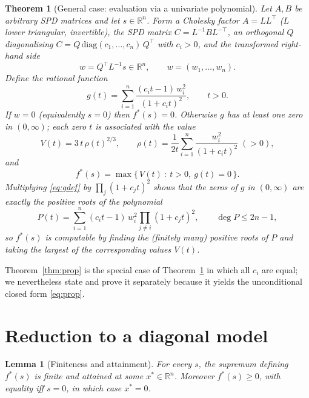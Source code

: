 \documentclass{amsart}
\newtheorem{theorem}{Theorem}
\newtheorem{lemma}{Lemma}
\theoremstyle{definition}
\begin{document}
\begin{theorem}[General case: evaluation via a univariate polynomial]\label{thm:gen}
Let $A,B$ be arbitrary SPD matrices and let $s\in\mathbb R^n$.  Form a Cholesky factor
$A=LL^{\!\top}$ ($L$ lower triangular, invertible), the SPD matrix
$C=L^{-1}BL^{-\top}$, an orthogonal $Q$ diagonalising $C=Q\,\mathrm{diag}(c_1,\dots,c_n)\,Q^{\!\top}$
with $c_i>0$, and the transformed right-hand side
\begin{equation}\label{eq:wdef}
w=Q^{\!\top}L^{-1}s\in\mathbb R^n,\qquad w=(w_1,\dots,w_n).
\end{equation}
Define the rational function
\begin{equation}\label{eq:gdef}
g(t)=\sum_{i=1}^n\frac{(c_i t-1)\,w_i^2}{(1+c_i t)^2},\qquad t>0 .
\end{equation}
If $w=0$ (equivalently $s=0$) then $f^\ast(s)=0$.  Otherwise $g$ has at least one zero in
$(0,\infty)$; each zero $t$ is associated with the value
\begin{equation}\label{eq:valt}
V(t)=3\,t\,\rho(t)^{2/3},\qquad
\rho(t)=\frac{1}{2t}\sum_{i=1}^n\frac{w_i^2}{(1+c_i t)^2}\;(>0),
\end{equation}
and
\begin{equation}\label{eq:fstar-gen}
f^\ast(s)=\max\bigl\{\,V(t)\ :\ t>0,\ g(t)=0\,\bigr\}.
\end{equation}
Multiplying \eqref{eq:gdef} by $\prod_{j}(1+c_j t)^2$ shows that the zeros of $g$ in $(0,\infty)$
are exactly the positive roots of the polynomial
\begin{equation}\label{eq:poly}
P(t)=\sum_{i=1}^n (c_i t-1)\,w_i^2\!\!\prod_{j\neq i}(1+c_j t)^2,\qquad \deg P\le 2n-1,
\end{equation}
so $f^\ast(s)$ is computable by finding the (finitely many) positive roots of $P$ and taking the
largest of the corresponding values $V(t)$.
\end{theorem}

Theorem~\ref{thm:prop} is the special case of Theorem~\ref{thm:gen} in which all $c_i$ are equal;
we nevertheless state and prove it separately because it yields the unconditional closed form
\eqref{eq:prop}.

\section{Reduction to a diagonal model}

\begin{lemma}[Finiteness and attainment]\label{lem:coerc}
For every $s$, the supremum defining $f^\ast(s)$ is finite and attained at some
$x^\ast\in\mathbb R^n$.  Moreover $f^\ast(s)\ge0$, with equality iff $s=0$, in which case
$x^\ast=0$.
\end{lemma}
\end{document}
